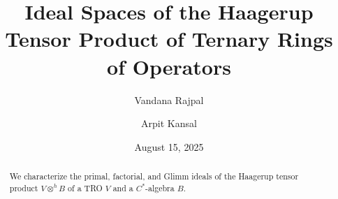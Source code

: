\documentclass{birkjour}
\theoremstyle{definition}
\theoremstyle{remark}
\numberwithin{equation}{section}
\begin{document}
%
%
%
%
%
%
%
%
%


\title[Ideal Spaces of the Haagerup Tensor Product of TROs]
 {Ideal Spaces of the Haagerup Tensor Product of Ternary Rings of Operators}



\author[V. Rajpal]{Vandana Rajpal}
\address{Department of Mathematics \\  Shivaji College, \\ University of Delhi, \\ Delhi-110 027, India}



\author[A. Kansal]{Arpit Kansal} 
\address{Department of Mathematics \\   Shyama Prasad Mukherji College for Women, \\ University
of Delhi, \\ Delhi-110 026}




\begin{abstract}
We characterize the primal, factorial, and Glimm ideals of the Haagerup tensor product $V\otimes^{h} B$ of a TRO $V$ and a $C^{\ast}$-algebra $B$.
\end{abstract}


\date{August 15, 2025}



\maketitle
\end{document}
